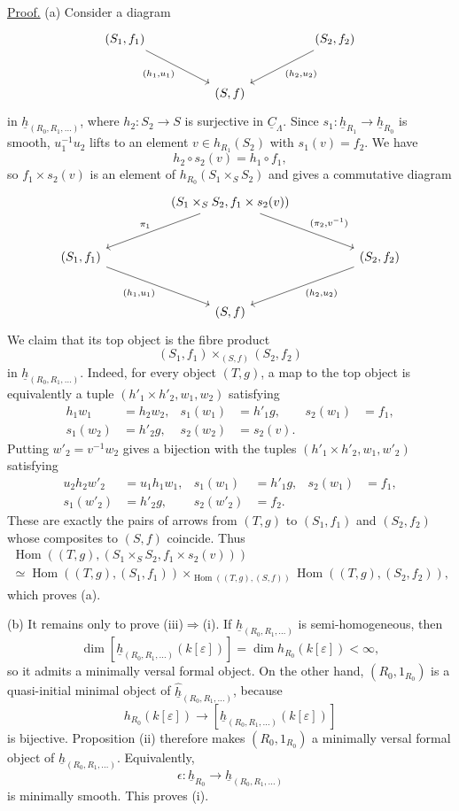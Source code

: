 \underline{Proof.} (a) Consider a diagram
\[
\begin{tikzcd}[column sep=huge,row sep=large]
 (S_1,f_1) \arrow[dr,"{(h_1,u_1)}"']
 && (S_2,f_2) \arrow[dl,"{(h_2,u_2)}"]\\
 & (S,f) &
\end{tikzcd}
\]
in $\underline h_{(R_0,R_1,\ldots)}$, where
$h_2:S_2\longrightarrow S$ is surjective in
$\underline C_\Lambda$. Since
$s_1:\underline h_{R_1}\longrightarrow\underline h_{R_0}$ is
smooth, $u_1^{-1}u_2$ lifts to an element $v\in h_{R_1}(S_2)$ with
$s_1(v)=f_2$. We have
\[
 h_2\circ s_2(v)=h_1\circ f_1,
\]
so $f_1\times s_2(v)$ is an element of
$h_{R_0}(S_1\times_SS_2)$ and gives a commutative diagram
\[
\begin{tikzcd}[column sep=huge,row sep=large]
 & (S_1\times_SS_2,f_1\times s_2(v))
   \arrow[dl,"{\pi_1}"']
   \arrow[dr,"{(\pi_2,v^{-1})}"] &\\
 (S_1,f_1) \arrow[dr,"{(h_1,u_1)}"']
 && (S_2,f_2) \arrow[dl,"{(h_2,u_2)}"]\\
 & (S,f) &
\end{tikzcd}
\]
We claim that its top object is the fibre product
\[
 (S_1,f_1)\times_{(S,f)}(S_2,f_2)
\]
in $\underline h_{(R_0,R_1,\ldots)}$. Indeed, for every object
$(T,g)$, a map to the top object is equivalently a tuple
$(h'_1\times h'_2,w_1,w_2)$ satisfying
\begin{align*}
 h_1w_1&=h_2w_2,&
 s_1(w_1)&=h'_1g,&s_2(w_1)&=f_1,\\
 s_1(w_2)&=h'_2g,&
 s_2(w_2)&=s_2(v).
\end{align*}
Putting $w'_2=v^{-1}w_2$ gives a bijection with the tuples
$(h'_1\times h'_2,w_1,w'_2)$ satisfying
\begin{align*}
 u_2h_2w'_2&=u_1h_1w_1,&
 s_1(w_1)&=h'_1g,&s_2(w_1)&=f_1,\\
 s_1(w'_2)&=h'_2g,&
 s_2(w'_2)&=f_2.
\end{align*}
These are exactly the pairs of arrows from $(T,g)$ to $(S_1,f_1)$
and $(S_2,f_2)$ whose composites to $(S,f)$ coincide. Thus
\begin{multline*}
 \operatorname{Hom}((T,g),(S_1\times_SS_2,
                 f_1\times s_2(v)))\\
 \simeq
 \operatorname{Hom}((T,g),(S_1,f_1))
 \times_{\operatorname{Hom}((T,g),(S,f))}
 \operatorname{Hom}((T,g),(S_2,f_2)),
\end{multline*}
which proves (a).


(b) It remains only to prove (iii)$\Rightarrow$(i). If
$\underline h_{(R_0,R_1,\ldots)}$ is semi-homogeneous, then
\[
 \dim[\underline h_{(R_0,R_1,\ldots)}(k[\varepsilon])]
 =\dim h_{R_0}(k[\varepsilon])<\infty,
\]
so it admits a minimally versal formal object. On the other hand,
$(R_0,1_{R_0})$ is a quasi-initial minimal object of
$\widehat{\underline h}_{(R_0,R_1,\ldots)}$, because
\[
 h_{R_0}(k[\varepsilon])
 \longrightarrow
 [\underline h_{(R_0,R_1,\ldots)}(k[\varepsilon])]
\]
is bijective. Proposition (ii) therefore makes
$(R_0,1_{R_0})$ a minimally versal formal object of
$\underline h_{(R_0,R_1,\ldots)}$. Equivalently,
\[
 \epsilon:\underline h_{R_0}
 \longrightarrow\underline h_{(R_0,R_1,\ldots)}
\]
is minimally smooth. This proves (i).
